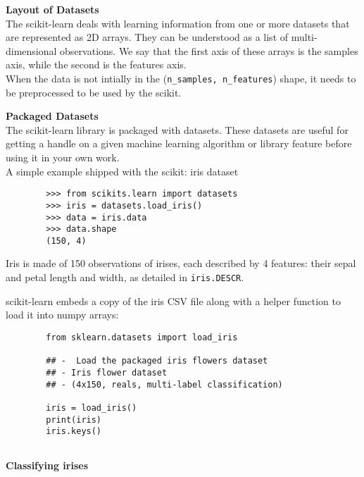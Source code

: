 \documentclass[SKL-MASTER.tex]{subfiles}
\begin{document}
	\LARGE
	
	\noindent \textbf{Layout of Datasets}\\
	The scikit-learn deals with learning information from one or more datasets that are represented as 2D arrays. They can be understood as a list of multi-dimensional observations. We say that the first axis of these arrays is the samples axis, while the second is the features axis.\\ 	When the data is not intially in the (\texttt{n\_samples, n\_features}) shape, it needs to be preprocessed to be used by the scikit.
	\bigskip
	
	\noindent \textbf{Packaged Datasets}\\
	The scikit-learn library is packaged with datasets. These datasets are useful for getting a handle on a given machine learning algorithm or library feature before using it in your own work. \\

	
\newpage	
\noindent	A simple example shipped with the scikit: iris dataset
	
	\begin{framed}
		\begin{verbatim}
		>>> from scikits.learn import datasets
		>>> iris = datasets.load_iris()
		>>> data = iris.data
		>>> data.shape
		(150, 4)
		\end{verbatim}
	\end{framed}
	
\noindent	Iris is made of 150 observations of irises, each described by 4 features: their sepal and petal length and width, as detailed in \texttt{iris.DESCR}.
	
	
	\newpage
	
	
	\noindent 
	scikit-learn embeds a copy of the iris CSV file along with a helper function to load it into numpy arrays:
	
	
	\begin{framed}
		\begin{verbatim}
		from sklearn.datasets import load_iris
		
		## -  Load the packaged iris flowers dataset
		## - Iris flower dataset 
		## - (4x150, reals, multi-label classification)
		
		iris = load_iris()
		print(iris)
		iris.keys()
		
	\end{verbatim}
	\end{framed}
	\newpage
\textbf{Classifying irises}
\end{document}
